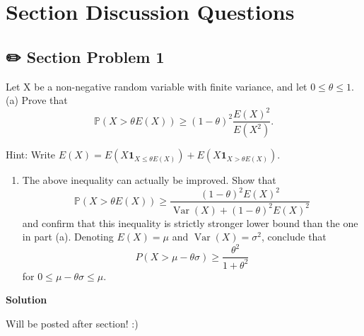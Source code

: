 \documentclass[
  letterpaper,
  DIV=11,
  numbers=noendperiod]{scrreprt}
\providecommand{\tightlist}{%
  \setlength{\itemsep}{0pt}\setlength{\parskip}{0pt}}\usepackage{longtable,booktabs,array}
\theoremstyle{definition}
\theoremstyle{plain}
\theoremstyle{remark}
\begin{document}
\hypertarget{section-discussion-questions-6}{%
\section*{Section Discussion
Questions}\label{section-discussion-questions-6}}


\hypertarget{section-problem-1-6}{%
\subsection*{✏️ Section Problem 1}\label{section-problem-1-6}}

Let \(\mathrm{X}\) be a non-negative random variable with finite
variance, and let \(0 \leq \theta \leq 1\). (a) Prove that \[
\mathbb{P}(X>\theta E(X)) \geq(1-\theta)^2 \frac{E(X)^2}{E\left(X^2\right)} .
\]

Hint: Write
\(E(X)=E\left(X \mathbf{1}_{X \leq \theta E(X)}\right)+E\left(X \mathbf{1}_{X>\theta E(X)}\right)\).

\begin{enumerate}
\def\labelenumi{(\alph{enumi})}
\setcounter{enumi}{1}
\tightlist
\item
  The above inequality can actually be improved. Show that \[
  \mathbb{P}(X>\theta E(X)) \geq \frac{(1-\theta)^2 E(X)^2}{\operatorname{Var}(X)+(1-\theta)^2 E(X)^2}
  \] and confirm that this inequality is strictly stronger lower bound
  than the one in part (a). Denoting \(E(X)=\mu\) and
  \(\operatorname{Var}(X)=\sigma^2\), conclude that \[
  P(X>\mu-\theta \sigma) \geq \frac{\theta^2}{1+\theta^2}
  \] for \(0 \leq \mu-\theta \sigma \leq \mu\).
\end{enumerate}

\begin{tcolorbox}[enhanced jigsaw, opacityback=0, colback=white, leftrule=.75mm, bottomrule=.15mm, arc=.35mm, rightrule=.15mm, breakable, left=2mm, toprule=.15mm, colframe=quarto-callout-tip-color-frame]
\begin{minipage}[t]{5.5mm}
\textcolor{quarto-callout-tip-color}{\faLightbulb}
\end{minipage}%
\begin{minipage}[t]{\textwidth - 5.5mm}

\textbf{Solution}\vspace{2mm}

Will be posted after section! :)

\end{minipage}%
\end{tcolorbox}
\end{document}

